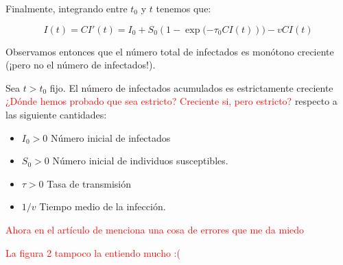 Finalmente, integrando entre $t_0$ y $t$ tenemos que:

$$I(t)=CI'(t)=I_0+S_0(1-\exp{(-\tau_0 CI(t)}))-vCI(t)$$

Observamos entonces que el número total de infectados es monótono creciente (¡pero no el número de infectados!). 

\begin{theorem}
Sea $t>t_0$ fijo. El número de infectados acumulados es estrictamente creciente \textcolor{red}{¿Dónde hemos probado que sea estricto? Creciente si, pero estricto?} respecto a las siguiente cantidades:
\begin{itemize}
\item $I_0>0$ Número inicial de infectados
\item $S_0>0$ Número inicial de individuos susceptibles.
\item $\tau>0$ Tasa de transmisión
\item $1/v$ Tiempo medio de la infección.
\end{itemize}
\end{theorem}

\textcolor{red}{Ahora en el artículo de \cite{demongeotSIEpidemicModel} menciona una cosa de errores que me da miedo}

\textcolor{red}{La figura 2 tampoco la entiendo mucho :(}







